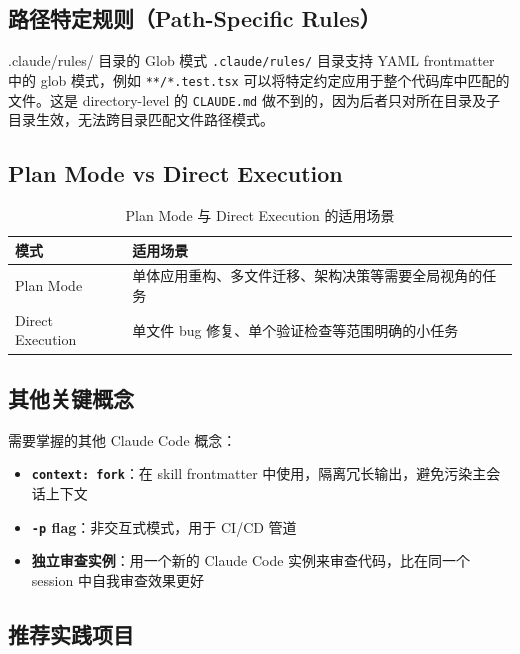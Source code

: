 \documentclass[a4paper]{article}
\begin{document}
\subsection{路径特定规则（Path-Specific Rules）}

\begin{knowledgebox}{.claude/rules/ 目录的 Glob 模式}
\texttt{.claude/rules/} 目录支持 YAML frontmatter 中的 glob 模式，例如 \texttt{**/*.test.tsx} 可以将特定约定应用于整个代码库中匹配的文件。这是 directory-level 的 \texttt{CLAUDE.md} 做不到的，因为后者只对所在目录及子目录生效，无法跨目录匹配文件路径模式。
\end{knowledgebox}

\subsection{Plan Mode vs Direct Execution}

\begin{table}[H]
\centering
\begin{tabular}{lp{9cm}}
\toprule
\textbf{模式} & \textbf{适用场景} \\
\midrule
Plan Mode & 单体应用重构、多文件迁移、架构决策等需要全局视角的任务 \\
Direct Execution & 单文件 bug 修复、单个验证检查等范围明确的小任务 \\
\bottomrule
\end{tabular}
\caption{Plan Mode 与 Direct Execution 的适用场景}
\end{table}

\subsection{其他关键概念}

需要掌握的其他 Claude Code 概念：
\begin{itemize}[leftmargin=1.5em]
    \item \textbf{\texttt{context: fork}}：在 skill frontmatter 中使用，隔离冗长输出，避免污染主会话上下文
    \item \textbf{\texttt{-p} flag}：非交互式模式，用于 CI/CD 管道
    \item \textbf{独立审查实例}：用一个新的 Claude Code 实例来审查代码，比在同一个 session 中自我审查效果更好
\end{itemize}

\subsection{推荐实践项目}
\end{document}
